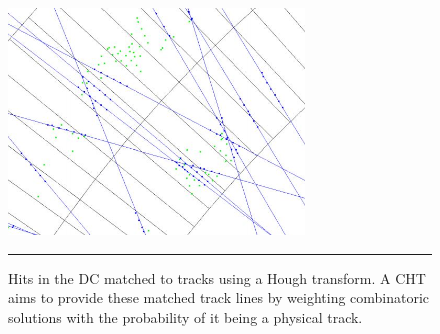 \begin{figure}[htbp!]
  \centering
    \includegraphics[width=0.7\textwidth]{Figures/houghtransformcartoon.JPG}
    \rule{35em}{0.5pt}
  \caption[Hits in the DC matched to tracks using a Hough transform]{Hits in the DC matched to tracks using a Hough transform. A CHT aims to provide these matched track lines by weighting combinatoric solutions with the probability of it being a physical track.}
  \label{fig:houghtransform}
\end{figure}

